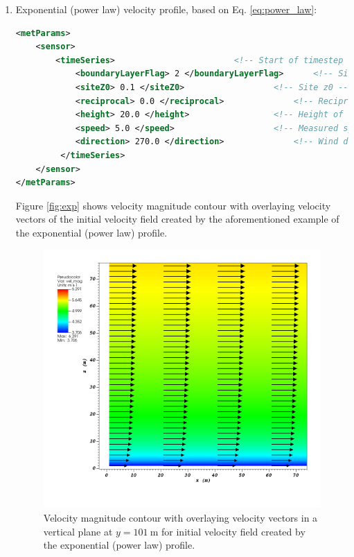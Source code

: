 \begin{enumerate}
\item Exponential (power law) velocity profile, based on Eq. \ref{eq:power_law}:

\begin{lstlisting}[language=XML]
<metParams>
	<sensor>
	    <timeSeries>						<!-- Start of timestep informastion for a sensor -->
       		<boundaryLayerFlag> 2 </boundaryLayerFlag> 		<!-- Site boundary layer flag (1-log (default), 2-exp, 3-urban canopy, 4-data entry) -->
       		<siteZ0> 0.1 </siteZ0> 					<!-- Site z0 -->
       		<reciprocal> 0.0 </reciprocal> 				<!-- Reciprocal Monin-Obukhov Length (1/m) -->
       		<height> 20.0 </height> 				<!-- Height of the sensor -->
       		<speed> 5.0 </speed> 					<!-- Measured speed at the sensor height -->
       		<direction> 270.0 </direction> 				<!-- Wind direction of sensor -->
    	 </timeSeries>
	</sensor>
</metParams>
\end{lstlisting}

Figure \ref{fig:exp} shows velocity magnitude contour with overlaying  velocity vectors of the initial velocity field created by the aforementioned example of the exponential (power law) profile.

\begin{figure}[H]
\includegraphics[width=\textwidth,keepaspectratio]{Images/exp_y_101.png}
\caption{Velocity magnitude contour with overlaying velocity vectors in a vertical plane at $y=101\ \si{\meter}$ for initial velocity field created by the exponential (power law) profile.}
\end{figure}
\noindent



\end{enumerate}
